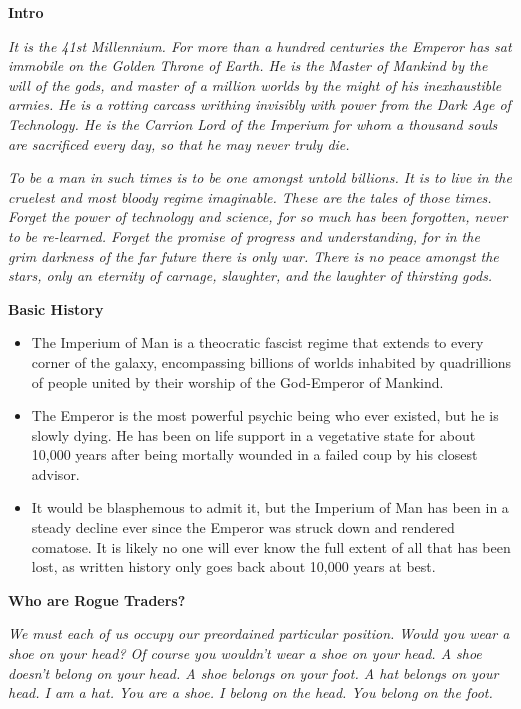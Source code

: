 \documentclass[10pt,a4paper]{article}
\newcommand{\rpgsection}[1]{%
  \vspace{0.8em}%
  {\headerfont\bfseries\Large #1}\par%
  \vspace{0.5em}%
}
\begin{document}
\vspace{1.0cm} %

\begin{multicols}{2}

\rpgsection{Intro}
\textit{It is the 41st Millennium. For more than a hundred centuries the Emperor has sat immobile on the Golden Throne of Earth. He is the Master of Mankind by the will of the gods, and master of a million worlds by the might of his inexhaustible armies. He is a rotting carcass writhing invisibly with power from the Dark Age of Technology. He is the Carrion Lord of the Imperium for whom a thousand souls are sacrificed every day, so that he may never truly die.}

\textit{To be a man in such times is to be one amongst untold billions. It is to live in the cruelest and most bloody regime imaginable. These are the tales of those times. Forget the power of technology and science, for so much has been forgotten, never to be re-learned. Forget the promise of progress and understanding, for in the grim darkness of the far future there is only war. There is no peace amongst the stars, only an eternity of carnage, slaughter, and the laughter of thirsting gods.}

\rpgsection{Basic History}
\begin{itemize}
  \item The Imperium of Man is a theocratic fascist regime that extends to every corner of the galaxy, encompassing billions of worlds inhabited by quadrillions of people united by their worship of the God-Emperor of Mankind.
  \item The Emperor is the most powerful psychic being who ever existed, but he is slowly dying. He has been on life support in a vegetative state for about 10,000 years after being mortally wounded in a failed coup by his closest advisor.
  \item It would be blasphemous to admit it, but the Imperium of Man has been in a steady decline ever since the Emperor was struck down and rendered comatose. It is likely no one will ever know the full extent of all that has been lost, as written history only goes back about 10,000 years at best.
\end{itemize}

\rpgsection{Who are Rogue Traders?}
\textit{We must each of us occupy our preordained particular position. Would you wear a shoe on your head? Of course you wouldn't wear a shoe on your head. A shoe doesn't belong on your head. A shoe belongs on your foot. A hat belongs on your head. I am a hat. You are a shoe. I belong on the head. You belong on the foot.}


\end{multicols}
\end{document}
